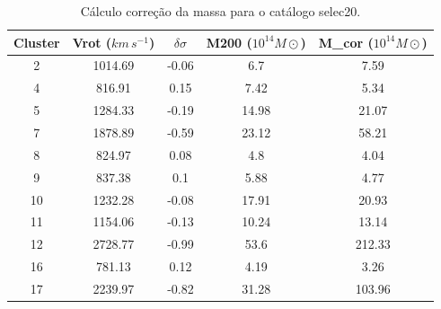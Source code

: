{\small
\begin{longtable}{ccccc}
\caption{Cálculo correção da massa para o catálogo selec20.}
\label{tab:massselec20}
\\ \hline
\textbf{Cluster} & \textbf{Vrot ($km \, s^{-1}$)} & \textbf{$\delta \sigma$} & \textbf{M200 ($10^{14}  M\odot$)} & \textbf{M_{cor} ($10^{14}  M\odot$)} \\ \hline
2 & 1014.69 & -0.06 & 6.7 & 7.59 \\
4 & 816.91 & 0.15 & 7.42 & 5.34 \\
5 & 1284.33 & -0.19 & 14.98 & 21.07 \\
7 & 1878.89 & -0.59 & 23.12 & 58.21 \\
8 & 824.97 & 0.08 & 4.8 & 4.04 \\
9 & 837.38 & 0.1 & 5.88 & 4.77 \\
10 & 1232.28 & -0.08 & 17.91 & 20.93 \\
11 & 1154.06 & -0.13 & 10.24 & 13.14 \\
12 & 2728.77 & -0.99 & 53.6 & 212.33 \\
16 & 781.13 & 0.12 & 4.19 & 3.26 \\
17 & 2239.97 & -0.82 & 31.28 & 103.96 \\
\end{longtable}
}

